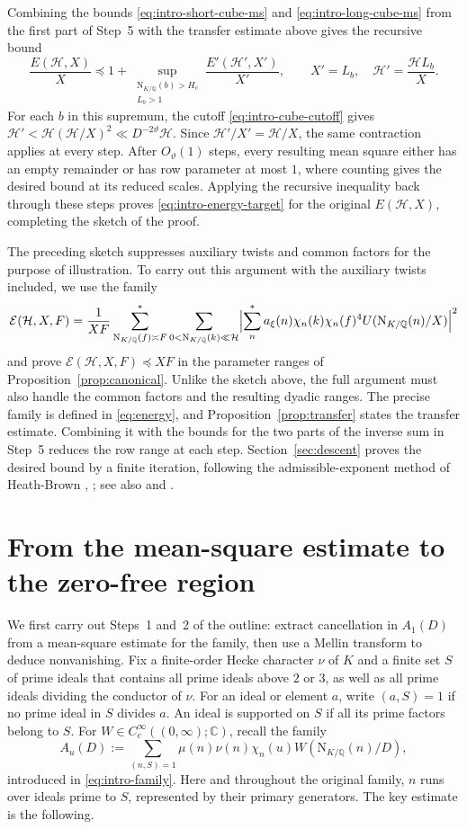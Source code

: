 \documentclass[11pt,a4paper]{article}
\numberwithin{equation}{section}
\numberwithin{figure}{section}
\theoremstyle{definition}
\theoremstyle{remark}
\newcommand{\Q}{\mathbb Q}
\newcommand{\NK}{\mathrm N_{K/\Q}}
\newcommand{\precbd}{\preccurlyeq}
\begin{document}
Combining the bounds \eqref{eq:intro-short-cube-ms} and
\eqref{eq:intro-long-cube-ms} from the first part of Step~5 with
the transfer estimate above gives the recursive bound
\[
 \frac{E(\mathcal H,X)}{X}
 \precbd 1+\sup_{\substack{\NK(b)>H_c\\L_b>1}}\frac{E'(\mathcal H',X')}{X'},
 \qquad X'=L_b,\quad \mathcal H'=\frac{\mathcal H L_b}{X}.
\]
For each $b$ in this supremum, the cutoff \eqref{eq:intro-cube-cutoff}
gives $\mathcal H'<\mathcal H(\mathcal H/X)^2
\ll D^{-2\vartheta}\mathcal H$.
Since $\mathcal H'/X'=\mathcal H/X$, the same contraction applies
at every step. After $O_\vartheta(1)$ steps, every resulting mean
square either has an empty remainder or has row parameter at most $1$,
where counting gives the desired bound at its reduced scales.
Applying the recursive inequality back through these steps proves
\eqref{eq:intro-energy-target} for the original $E(\mathcal H,X)$,
completing the sketch of the proof.

The preceding sketch suppresses auxiliary twists and common factors for the purpose of illustration. To carry out this argument with the auxiliary twists included, we use the family
\[
 \mathcal E(\mathcal H,X,F)
 =\frac1{XF}\sum_{\NK(f)\asymp F}^*
   \sum_{0<\NK(k)\ll\mathcal H}
 \Bigl|\sum_n^*a_\xi(n)\chi_n(k)\chi_n(f)^4
                      U(\NK(n)/X)\Bigr|^2
\]
and prove $\mathcal E(\mathcal H,X,F)\precbd XF$ in the parameter
ranges of Proposition~\ref{prop:canonical}. Unlike the sketch above, the full
argument must also handle the common factors and the resulting dyadic
ranges.
The precise family is defined in \eqref{eq:energy}, and
Proposition~\ref{prop:transfer} states the transfer estimate.
Combining it with the bounds for the two parts of
the inverse sum in Step~5 reduces the row range at each step.
Section~\ref{sec:descent} proves the desired bound by a finite iteration,
following the admissible-exponent method of Heath-Brown
\cite[Lemma~8 and \S8]{HB95}, \cite[Lemma~9]{HB00}; see also
\cite[Theorem~4.1]{GL} and \cite[\S3.2]{BGL}.

\section{From the mean-square estimate to the zero-free region}\label{sec:reduction}

We first carry out Steps~1 and~2 of the outline: extract
cancellation in $A_1(D)$ from a mean-square estimate for the family,
then use a Mellin transform to deduce nonvanishing.
Fix a finite-order Hecke character $\nu$ of $K$ and a finite set $S$
of prime ideals that contains all prime ideals above $2$ or $3$, as
well as all prime ideals dividing the conductor of $\nu$.
For an ideal or element $a$, write $(a,S)=1$ if no prime ideal in $S$
divides $a$.
An ideal is supported on $S$ if all its prime factors belong to $S$.
For $W\in C_c^\infty((0,\infty);\mathbb C)$, recall the family
\[
 A_u(D):=\sum_{(n,S)=1}\mu(n)\nu(n)\chi_n(u)W(\NK(n)/D),
\]
introduced in \eqref{eq:intro-family}. Here and throughout the
original family, $n$ runs over ideals prime to $S$, represented by
their primary generators. The key estimate is the following. 
\end{document}
